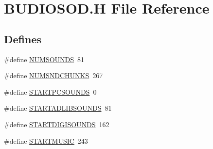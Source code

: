 \hypertarget{BUDIOSOD_8H}{
\section{BUDIOSOD.H File Reference}
\label{BUDIOSOD_8H}
}
\subsection*{Defines}
\begin{DoxyCompactItemize}
\item 
\#define \hyperlink{BUDIOSOD_8H_aa948e91a657468d5faa690ec1a89230b}{NUMSOUNDS}~81
\item 
\#define \hyperlink{BUDIOSOD_8H_adb660029e11963733384781d8bd6dc24}{NUMSNDCHUNKS}~267
\item 
\#define \hyperlink{BUDIOSOD_8H_a1c2885b0208a74942feaa303bb5b1119}{STARTPCSOUNDS}~0
\item 
\#define \hyperlink{BUDIOSOD_8H_a7d40bf6bf62cde9ae5f212e063328200}{STARTADLIBSOUNDS}~81
\item 
\#define \hyperlink{BUDIOSOD_8H_adb5a42984ba81d350a944cc41434a6f7}{STARTDIGISOUNDS}~162
\item 
\#define \hyperlink{BUDIOSOD_8H_acdd20a00d56efe82715df1d7a2facc10}{STARTMUSIC}~243
\end{DoxyCompactItemize}
